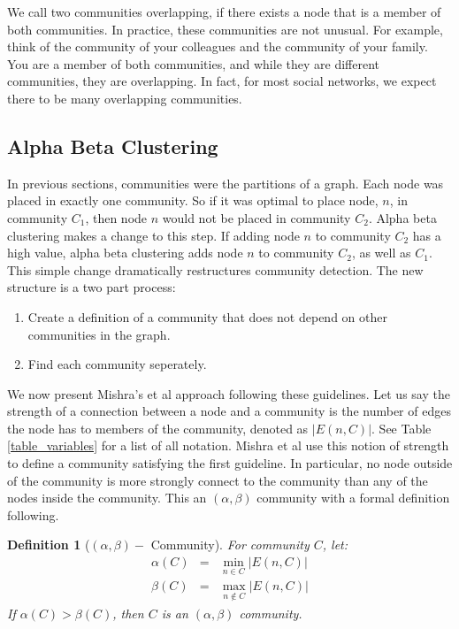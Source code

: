 \documentclass[phd,tocprelim]{cornell}
\newtheorem{definition}{Definition}
\begin{document}
We call two communities overlapping, if there exists a node that is a member of both communities.  In practice, these communities are not unusual.  For example, think of the community of your colleagues and the community of your family. You are a member of both communities, and while they are different communities, they are overlapping.  In fact, for most social networks, we expect there to be many overlapping communities.


\subsection{Alpha Beta Clustering}

In previous sections, communities were the partitions of a graph.  Each node was placed in exactly one community.  So if it was optimal to place node, $n$, in community $C_1$, then node $n$ would not be placed in community $C_2$.  Alpha beta clustering makes a change to this step.  If adding node $n$ to community $C_2$ has a high value, alpha beta clustering adds node $n$ to community $C_2$, as well as $C_1$.  This simple change dramatically restructures community detection.  The new structure is a two part process:
\begin{enumerate}
\item Create a definition of a community that does not depend on other communities in the graph.
\item Find each community seperately.
\end{enumerate}

We now present Mishra's et al \cite{mishra} approach following these guidelines.  Let us say the strength of a connection between a node and a community is the number of edges the node has to members of the community, denoted as $|E(n, C)|$.  See Table \ref{table_variables} for a list of all notation. Mishra et al \cite{mishra} use this notion of strength to define a community satisfying the first guideline.  In particular, no node outside of the community is more strongly connect to the community than any of the nodes inside the community.  This an $(\alpha, \beta)$ community with a formal definition following.
\begin{definition}[$(\alpha, \beta) - $ Community]
For community $C$, let:
\begin{eqnarray*}
\alpha(C) &=& \min\limits_{n \in C} |E(n, C)|\\
\beta(C) &=& \max\limits_{n \notin C} |E(n, C)|
\end{eqnarray*}
If $\alpha(C) > \beta(C)$, then $C$ is an $(\alpha, \beta)$ community.
\end{definition}
\end{document}
